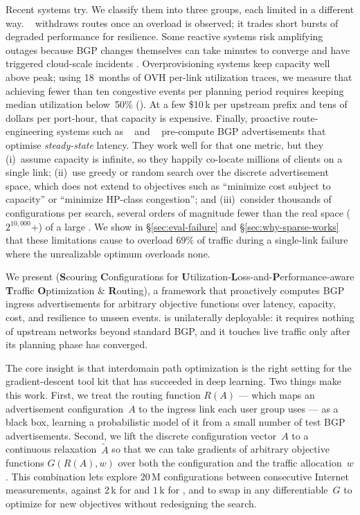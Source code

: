 \documentclass[acmsmall,anonymous,review,nonacm,10pt]{acmart}
\begin{document}
Recent systems try.  We classify them into three groups, each
limited in a different way.
\tipsy~\cite{tipsy} withdraws routes once an overload is observed;
it trades short bursts of degraded performance for resilience. Some
reactive systems risk amplifying outages because BGP changes themselves can take
minutes to converge and have triggered cloud-scale incidents
\cite{msft-bgp-outage,fb-bgp-outage,isp-bgp-outage,google-capa-nsdi}.
Overprovisioning systems
\cite{akamai-overprovision,facebook-capacity-planning,google-capa-nsdi}
keep capacity well above peak; using 18~months of OVH per-link
utilization traces, we measure that achieving fewer than ten
congestive events per planning period requires keeping median
utilization below~50\% ().  At a few
\$10\,k per upstream prefix and tens of dollars per port-hour,
that capacity is expensive.
Finally, proactive route-engineering systems such as
\painter~\cite{painter} and \anyopt~\cite{anyopt} pre-compute BGP
advertisements that optimise \emph{steady-state} latency.  They
work well for that one metric, but they (i)~assume capacity is
infinite, so they happily co-locate millions of clients on a
single link; (ii)~use greedy or random search over the discrete
advertisement space, which does not extend to objectives such as
``minimize cost subject to capacity'' or ``minimize HP-class
congestion''; and (iii)~consider thousands of configurations per
search, several orders of magnitude fewer than the real space
($2^{10{,}000}$+) of a large \servprod.  We show in
\S\ref{sec:eval-failure} and \S\ref{sec:why-sparse-works} that
these limitations cause \painter to overload $69\%$ of traffic
during a single-link failure where the unrealizable optimum
overloads none.

  We present \sparse (\textbf{S}couring
\textbf{C}onfigurations for
\textbf{U}tilization-\textbf{L}oss-and-\textbf{P}erformance-aware
\textbf{T}raffic \textbf{O}ptimization \& \textbf{R}outing), a
framework that proactively computes BGP ingress
advertisements for arbitrary objective functions over latency,
capacity, cost, and resilience to unseen events.  \sparse is
unilaterally deployable: it requires nothing of upstream networks
beyond standard BGP, and it touches live traffic only after
its planning phase has converged.

The core insight is that interdomain path optimization is the
right setting for the gradient-descent tool kit that has succeeded
in deep learning.  Two things make this work.  First, we treat
the routing function $R(A)$ --- which maps an advertisement
configuration~$A$ to the ingress link each user group uses --- as a
black box, learning a probabilistic model of it from a small
number of test BGP advertisements.  Second, we lift the discrete
configuration vector~$A$ to a continuous relaxation~$\tilde A$ so
that we can take gradients of arbitrary objective functions
$G(R(A),w)$ over both the configuration and the traffic
allocation~$w$.  This combination lets \sparse explore $20$\,M
configurations between consecutive Internet measurements, against
$2$\,k for \painter and $1$\,k for \anyopt, and to swap in any
differentiable~$G$ to optimize for new objectives without redesigning
the search.
\end{document}
